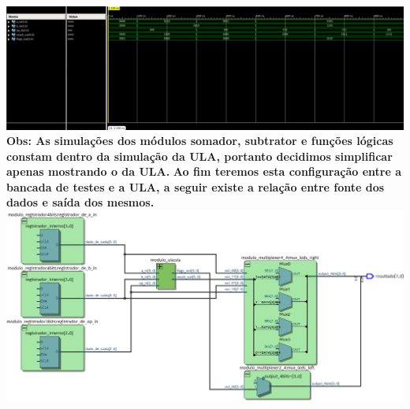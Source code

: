 \documentclass[11pt]{book}
\begin{document}
\newline\newline
\includegraphics[width=1.1\textwidth]{Simulacao_ULA.png}\\
\textbf{Obs: As simulações dos módulos somador, subtrator e funções lógicas constam dentro da simulação da ULA, portanto decidimos simplificar apenas mostrando o da ULA.}
\newline
\newline
\textbf{Ao fim teremos esta configuração entre a bancada de testes e a ULA, a seguir existe a relação entre fonte dos dados e saída dos mesmos.}
\newline
\includegraphics[width=1.1\textwidth]{Config_Bancada_ULA.png}%
\newline\newline
\end{document}
